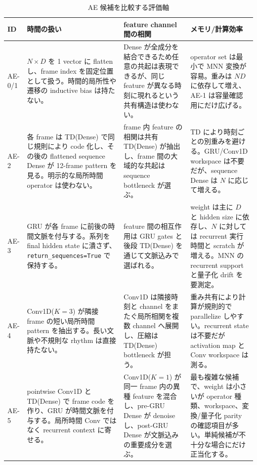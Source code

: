\begin{table}[tb]
  \centering
  \caption{AE 候補を比較する評価軸}
  \label{tab:ae-eval-viewpoints}
  \small
  \begin{tabularx}{\linewidth}{lY Y Y}
    \toprule
    ID & 時間の扱い & feature channel 間の相関 & メモリ/計算効率 \\
    \midrule
    AE-0/1 &
    $N \times D$ を 1 vector に flatten し、frame index を固定位置として扱う。時間的局所性や遷移の inductive bias は持たない。 &
    Dense が全成分を結合できるため任意の共起は表現できるが、同じ feature が異なる時刻に現れるという共有構造は使わない。 &
    operator set は最小で MNN 変換が容易。重みは $N D$ に依存して増え、AE-1 は容量確認用にだけ広げる。 \\
    AE-2 &
    各 frame は TD(Dense) で同じ規則により code 化し、その後の flattened sequence Dense が 12-frame pattern を見る。明示的な局所時間 operator は使わない。 &
    frame 内 feature の相関は共有 TD(Dense) が抽出し、frame 間の大域的な共起は sequence bottleneck が選ぶ。 &
    TD により時刻ごとの別重みを避ける。GRU/Conv1D workspace は不要だが、sequence Dense は $N$ に応じて増える。 \\
    AE-3 &
    GRU が各 frame に前後の時間文脈を付与する。系列を final hidden state に潰さず、\texttt{return\_sequences=True} で保持する。 &
    feature 間の相互作用は GRU gates と後段 TD(Dense) を通じて文脈込みで選ばれる。 &
    weight は主に $D$ と hidden size に依存し、$N$ に対しては recurrent 実行時間と scratch が増える。MNN の recurrent support と量子化 drift を要測定。 \\
    AE-4 &
    Conv1D($K=3$) が隣接 frame の短い局所時間 pattern を抽出する。長い文脈や不規則な rhythm は直接持たない。 &
    Conv1D は隣接時刻と channel をまたぐ局所相関を複数 channel へ展開し、圧縮は TD(Dense) bottleneck が担う。 &
    重み共有により計算が規則的で parallelize しやすい。recurrent state は不要だが activation map と Conv workspace は測る。 \\
    AE-5 &
    pointwise Conv1D と TD(Dense) で frame code を作り、GRU が時間文脈を付与する。局所時間 Conv ではなく recurrent context に寄せる。 &
    Conv1D($K=1$) が同一 frame 内の異種 feature を混合し、pre-GRU Dense が denoise し、post-GRU Dense が文脈込みの重要成分を選ぶ。 &
    最も複雑な候補で、weight は小さいが operator 種類、workspace、変換/量子化 parity の確認項目が多い。単純候補が不十分な場合にだけ正当化する。 \\
    \bottomrule
  \end{tabularx}
\end{table}


